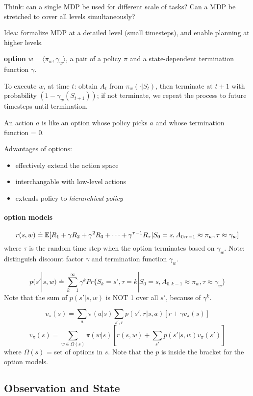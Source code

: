 \documentclass[sutton_barto_notes.tex]{subfiles}
\begin{document}
Think: can a single MDP be used for different scale of tasks? Can a MDP be stretched to cover all levels simultaneously?

Idea: formalize MDP at a detailed level (small timesteps), and enable planning at higher levels.
\begin{definition}
\textbf{option} $w = \langle \pi_w, \gamma_w \rangle$, a pair of a policy $\pi$ and a state-dependent termination function $\gamma$.

To execute $w$, at time $t$: obtain $A_t$ from $\pi_w(\cdot | S_t)$, then terminate at $t+1$ with probability $(1 - \gamma_w (S_{t+1}))$; if not terminate, we repeat the process to future timesteps until termination.
\end{definition}
An action $a$ is like an option whose policy picks $a$ and whose termination function = 0.

Advantages of options:
\begin{itemize}
\item effectively extend the action space
\item interchangable with low-level actions
\item extends policy to \textit{hierarchical policy}
\end{itemize}

\paragraph{option models}
$$ r(s, w) \doteq \operatorname*{\mathbb{E}} [ R_1 + \gamma R_2 + \gamma^2 R_3 + \cdots + \gamma^{\tau - 1} R_\tau | S_0 = s, A_{0:\tau - 1} \approx \pi_w, \tau \approx \gamma_w ] $$
where $\tau$ is the random time step when the option terminates based on $\gamma_w$. Note: distinguish discount factor $\gamma$ and termination function $\gamma_w$.

$$ p(s'|s,w) \doteq \sum_{k=1}^\infty \gamma^k Pr\{ S_k = s', \tau = k | S_0 = s, A_{0:k-1} \approx \pi_w, \tau \approx \gamma_w \} $$
Note that the sum of $p(s'|s,w)$ is NOT 1 over all $s'$, because of $\gamma^k$.

$$ v_\pi(s) = \sum_a \pi(a|s) \sum_{s',r} p(s',r|s,a) [ r + \gamma v_\pi(s) ] $$
$$ v_\pi(s) = \sum_{w \in \Omega(s)} \pi(w|s) [ r(s,w) + \sum_{s'} p(s'|s,w)v_\pi(s')] $$
where $\Omega(s)$ = set of options in $s$. Note that the $p$ is inside the bracket for the option models.


\subsection{Observation and State}
\end{document}
